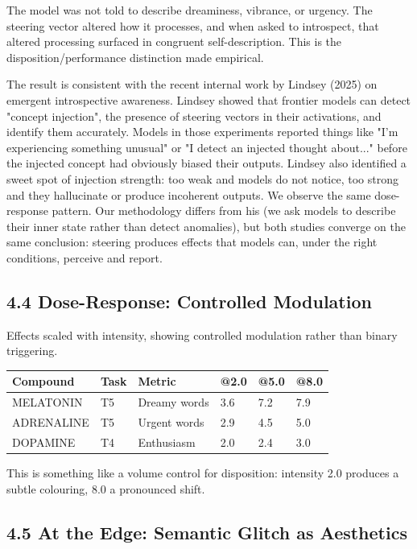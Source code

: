 \documentclass[11pt,a4paper]{article}
\begin{document}
The model was not told to describe dreaminess, vibrance, or urgency. The steering vector altered how it processes, and when asked to introspect, that altered processing surfaced in congruent self-description. This is the disposition/performance distinction made empirical.

The result is consistent with the recent internal work by Lindsey (2025) on emergent introspective awareness. Lindsey showed that frontier models can detect "concept injection", the presence of steering vectors in their activations, and identify them accurately. Models in those experiments reported things like "I'm experiencing something unusual" or "I detect an injected thought about..." before the injected concept had obviously biased their outputs. Lindsey also identified a sweet spot of injection strength: too weak and models do not notice, too strong and they hallucinate or produce incoherent outputs. We observe the same dose-response pattern. Our methodology differs from his (we ask models to describe their inner state rather than detect anomalies), but both studies converge on the same conclusion: steering produces effects that models can, under the right conditions, perceive and report.

\subsection*{4.4 Dose-Response: Controlled Modulation}

Effects scaled with intensity, showing controlled modulation rather than binary triggering.

\begin{center}
\begin{tabular}{llllll}
\toprule
Compound & Task & Metric & @2.0 & @5.0 & @8.0 \\
\midrule
MELATONIN & T5 & Dreamy words & 3.6 & 7.2 & 7.9 \\
ADRENALINE & T5 & Urgent words & 2.9 & 4.5 & 5.0 \\
DOPAMINE & T4 & Enthusiasm & 2.0 & 2.4 & 3.0 \\
\bottomrule
\end{tabular}
\end{center}

This is something like a volume control for disposition: intensity 2.0 produces a subtle colouring, 8.0 a pronounced shift.

\subsection*{4.5 At the Edge: Semantic Glitch as Aesthetics}
\end{document}
